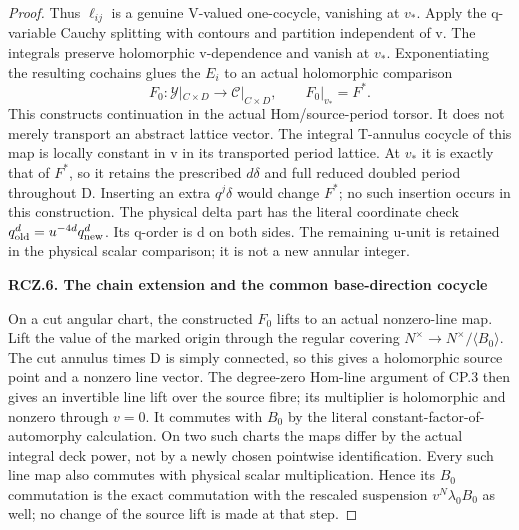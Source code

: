 \begin{proof}
Thus \(\ell_{ij}\) is a genuine V-valued one-cocycle, vanishing
at \(v_*\). Apply the q-variable Cauchy splitting with contours and
partition independent of v. The integrals preserve holomorphic
v-dependence and vanish at \(v_*\). Exponentiating the resulting
cochains glues the \(E_i\) to an actual holomorphic comparison
\[
             F_0:\mathcal Y|_{C\times D}
                         \longrightarrow\mathcal C|_{C\times D},
                   \qquad F_0|_{v_*}=F^*.
\]
This constructs continuation in the actual Hom/source-period
torsor. It does not merely transport an abstract lattice vector.
The integral T-annulus cocycle of this map is locally constant in
v in its transported period lattice. At \(v_*\) it is exactly that of
\(F^*\), so it retains the prescribed \(d\delta\) and full reduced doubled
period throughout D. Inserting an extra \(q^j\delta\) would
change \(F^*\); no such insertion occurs in this construction.
The physical delta part has the literal coordinate check
\(q_{\rm old}^d=u^{-4d}q_{\rm new}^d\). Its q-order is d
on both sides. The remaining u-unit is retained in the physical
scalar comparison; it is not a new annular integer.

\par

\medskip\noindent\textbf{RCZ.6. The chain extension and the common base-direction cocycle}

\par\nobreak

On a cut angular chart, the constructed \(F_0\) lifts to an actual
nonzero-line map. Lift the value of the marked origin through the
regular covering \(N^\times\to N^\times/\langle B_0\rangle\).
The cut annulus times D is simply connected, so this gives a
holomorphic source point and a nonzero line vector. The
degree-zero Hom-line argument of CP.3 then gives an invertible
line lift over the source fibre; its multiplier is holomorphic
and nonzero through \(v=0\). It commutes with \(B_0\) by the literal
constant-factor-of-automorphy calculation. On two such charts
the maps differ by the actual integral deck power, not by a
newly chosen pointwise identification.
Every such line map also commutes with physical scalar
multiplication. Hence its \(B_0\) commutation is the exact commutation
with the rescaled suspension \(v^N\lambda_0B_0\) as well;
no change of the source lift is made at that step.


\end{proof}
